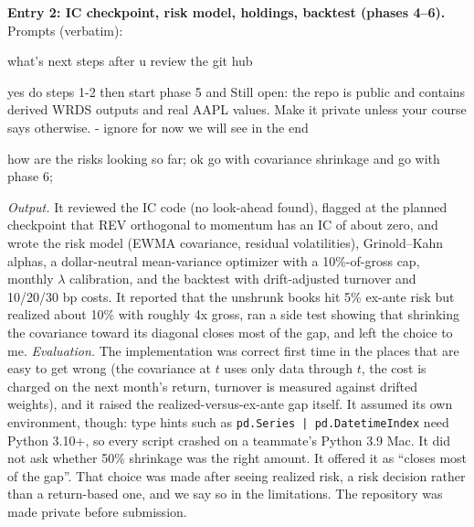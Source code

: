 \textbf{Entry 2: IC checkpoint, risk model, holdings, backtest (phases 4--6).} Prompts (verbatim):
\begin{promptbox}
\noindent what's next steps after u review the git hub

\medskip\noindent yes do steps 1-2 then start phase 5 and Still open: the repo is public and contains derived WRDS outputs and real AAPL values. Make it private unless your course says otherwise. - ignore for now we will see in the end

\medskip\noindent how are the risks looking so far; ok go with covariance shrinkage and go with phase 6;
\end{promptbox}
\emph{Output.} It reviewed the IC code (no look-ahead found), flagged at the planned checkpoint that REV orthogonal to momentum has an IC of about zero, and wrote the risk model (EWMA covariance, residual volatilities), Grinold--Kahn alphas, a dollar-neutral mean-variance optimizer with a 10\%-of-gross cap, monthly $\lambda$ calibration, and the backtest with drift-adjusted turnover and 10/20/30 bp costs. It reported that the unshrunk books hit 5\% ex-ante risk but realized about 10\% with roughly 4x gross, ran a side test showing that shrinking the covariance toward its diagonal closes most of the gap, and left the choice to me. \emph{Evaluation.} The implementation was correct first time in the places that are easy to get wrong (the covariance at $t$ uses only data through $t$, the cost is charged on the next month's return, turnover is measured against drifted weights), and it raised the realized-versus-ex-ante gap itself. It assumed its own environment, though: type hints such as \texttt{pd.Series | pd.DatetimeIndex} need Python 3.10+, so every script crashed on a teammate's Python 3.9 Mac. It did not ask whether 50\% shrinkage was the right amount. It offered it as ``closes most of the gap''. That choice was made after seeing realized risk, a risk decision rather than a return-based one, and we say so in the limitations. The repository was made private before submission.

